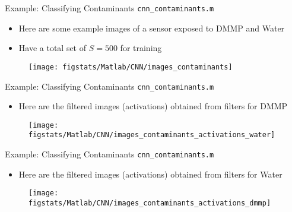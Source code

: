 \documentclass[9pt]{beamer}
\begin{document}
\begin{frame}{Example: Classifying Contaminants \footnotesize{\texttt{cnn\_contaminants.m}}}

\begin{itemize}
\item Here are some example images of a sensor exposed to DMMP and Water 
\item Have a total set of $S=500$ for training 
\end{itemize}

\begin{figure}[!htb]
    \centering
\texttt{[image: figstats/Matlab/CNN/images\_contaminants]}
\end{figure}

\end{frame}


\begin{frame}{Example: Classifying Contaminants \footnotesize{\texttt{cnn\_contaminants.m}}}

\begin{itemize}
\item Here are the filtered images (activations) obtained from filters for DMMP
\end{itemize}

\begin{figure}[!htb]
    \centering
\texttt{[image: figstats/Matlab/CNN/images\_contaminants\_activations\_water]}
\end{figure}

\end{frame}

\begin{frame}{Example: Classifying Contaminants \footnotesize{\texttt{cnn\_contaminants.m}}}

\begin{itemize}
\item Here are the filtered images (activations) obtained from filters for Water
\end{itemize}

\begin{figure}[!htb]
    \centering
\texttt{[image: figstats/Matlab/CNN/images\_contaminants\_activations\_dmmp]}
\end{figure}

\end{frame}
\end{document}
